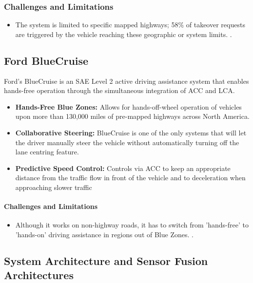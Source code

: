 \documentclass[12pt, a4paper]{report}
\begin{document}
\subsubsection{Challenges and Limitations}

\begin{itemize}
    \item The system is limited to specific mapped highways; 58\% of takeover requests are triggered by the vehicle reaching these geographic or system limits. \cite{ref8}.
\end{itemize}

\subsection*{Ford BlueCruise}

Ford’s BlueCruise is an \ac{SAE} Level 2 active driving assistance system that enables hands-free operation through the simultaneous integration of \ac{ACC} and \ac{LCA}.

\begin{itemize}
    \item \textbf{Hands-Free Blue Zones:} Allows for hands-off-wheel operation of vehicles upon more than 130,000 miles of pre-mapped highways across North America.
    \item \textbf{Collaborative Steering:} BlueCruise is one of the only systems that will let the driver manually steer the vehicle without automatically turning off the lane centring feature.
    \item \textbf{Predictive Speed Control:} Controls via \ac{ACC} to keep an appropriate distance from the traffic flow in front of the vehicle and to deceleration when approaching slower traffic
\end{itemize}

\paragraph{Challenges and Limitations}

\begin{itemize}
    \item Although it works on non-highway roads, it has to switch from 'hands-free' to 'hands-on' driving assistance in regions out of Blue Zones. \cite{ref9}.
\end{itemize}

\subsection{System Architecture and Sensor Fusion Architectures}
\end{document}
